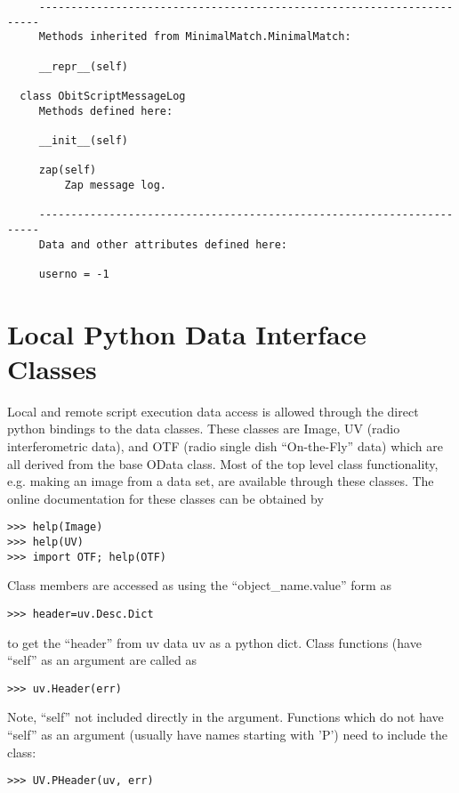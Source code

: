 \documentclass[11pt]{report}
\begin{document}
\begin{verbatim}
     ----------------------------------------------------------------------
     Methods inherited from MinimalMatch.MinimalMatch:
     
     __repr__(self)
    
  class ObitScriptMessageLog
     Methods defined here:
     
     __init__(self)
     
     zap(self)
         Zap message log.
     
     ----------------------------------------------------------------------
     Data and other attributes defined here:
     
     userno = -1
\end{verbatim}

\section{Local Python Data Interface Classes}
   Local and remote script execution data access is allowed through
the direct python bindings to the data classes.
These classes are Image, UV (radio interferometric data), and OTF
(radio single dish ``On-the-Fly'' data) which are all derived from the
base OData class.
Most of the top level class functionality, e.g. making an image from a
data set, are available through these classes.
The online documentation for these classes can be obtained by
\begin{verbatim}
>>> help(Image)
>>> help(UV)
>>> import OTF; help(OTF)
\end{verbatim}
Class members are accessed as using the ``object\_name.value'' form as
\begin{verbatim}
>>> header=uv.Desc.Dict
\end{verbatim}
to get the ``header'' from uv data uv as a python dict.
Class functions (have ``self'' as an argument are called as
\begin{verbatim}
>>> uv.Header(err)
\end{verbatim}
Note, ``self'' not included directly in the argument.
Functions which do not have ``self'' as an argument (usually have
names starting with 'P') need to include
the class:
\begin{verbatim}
>>> UV.PHeader(uv, err)
\end{verbatim}
\end{document}
